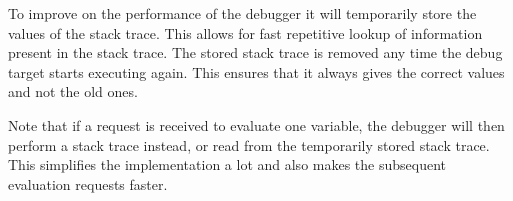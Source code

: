 To improve on the performance of the debugger it will temporarily store the values of the stack trace.
This allows for fast repetitive lookup of information present in the stack trace.
The stored stack trace is removed any time the debug target starts executing again.
This ensures that it always gives the correct values and not the old ones.


Note that if a request is received to evaluate one variable, the debugger will then perform a stack trace instead, or read from the temporarily stored stack trace.
This simplifies the implementation a lot and also makes the subsequent evaluation requests faster.

